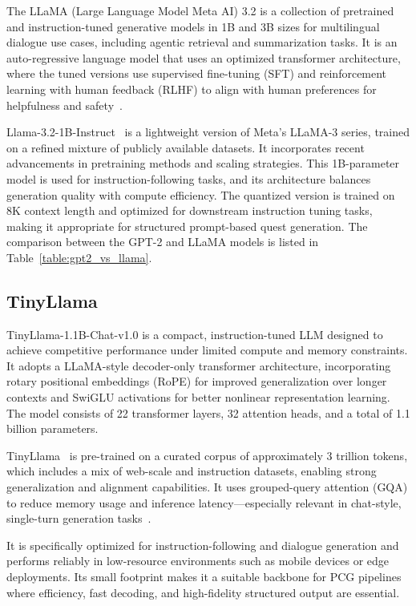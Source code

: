 The LLaMA (Large Language Model Meta AI) 3.2 is a collection of pretrained and
instruction-tuned generative models in 1B and 3B sizes for multilingual dialogue use
cases, including agentic retrieval and summarization tasks. It is an auto-regressive language
model that uses an optimized transformer architecture, where the tuned versions use
supervised fine-tuning (SFT) and reinforcement learning with human feedback (RLHF)
to align with human preferences for helpfulness and safety~\cite{dao2023flashattention2,touvron2023llama}.

Llama-3.2-1B-Instruct~\cite{llama32} is a lightweight version of Meta's LLaMA-3 series, trained on
a refined mixture of publicly available datasets. It incorporates recent advancements
in pretraining methods and scaling strategies. This 1B-parameter model is used for
instruction-following tasks, and its architecture balances generation quality with compute
efficiency. The quantized version is trained on 8K context length and optimized for
downstream instruction tuning tasks, making it appropriate for structured prompt-based
quest generation. The comparison between the GPT-2 and LLaMA models is listed in
Table~\ref{table:gpt2_vs_llama}.

\subsection{TinyLlama}

TinyLlama-1.1B-Chat-v1.0 is a compact, instruction-tuned LLM designed to achieve competitive
performance under limited compute and memory constraints. It adopts a LLaMA-style
decoder-only transformer architecture, incorporating rotary positional embeddings
(RoPE) for improved generalization over longer contexts and SwiGLU activations for
better nonlinear representation learning. The model consists of 22 transformer layers, 32
attention heads, and a total of 1.1 billion parameters.

TinyLlama~\cite{tinyllama,zhang2024tinyllama} is pre-trained on a curated corpus of approximately 3 trillion tokens, which
includes a mix of web-scale and instruction datasets, enabling strong generalization and
alignment capabilities. It uses grouped-query attention (GQA) to reduce memory usage
and inference latency—especially relevant in chat-style, single-turn generation tasks~\cite{lit-gpt,dao2023flashattention2}.

It is specifically optimized for instruction-following and dialogue generation and performs
reliably in low-resource environments such as mobile devices or edge deployments.
Its small footprint makes it a suitable backbone for PCG pipelines where efficiency, fast
decoding, and high-fidelity structured output are essential.

